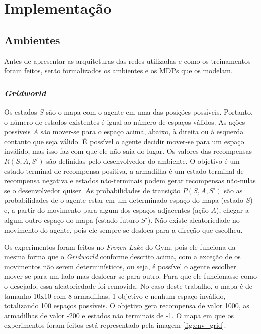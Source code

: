 


\chapter{Implementação}
\label{cap:implementacao}

\section{Ambientes}
\label{sec:envs}


Antes de apresentar as arquiteturas das redes utilizadas e como os treinamentos foram feitos, serão formalizados os ambientes e os \hyperref[sec:mdp]{MDPs} que os modelam.

\subsection{\textit{Gridworld}}
\label{sec:env_gw}

Os estados $S$ são o mapa com o agente em uma das posições possíveis.
Portanto, o número de estados existentes é igual ao número de espaços válidos.
As ações possíveis $A$ são mover-se para o espaço acima, abaixo, à direita ou à esquerda contanto que seja válido.
É possível o agente decidir mover-se para um espaço inválido, mas isso faz com que ele não saia do lugar.
Os valores das recompensas $R(S,A,S')$ são definidas pelo desenvolvedor do ambiente.
O objetivo é um estado terminal de recompensa positiva, a armadilha é um estado terminal de recompensa negativa e estados não-terminais podem gerar recompensas não-nulas se o desenvolvedor quiser.
As probabilidades de transição $P(S,A,S')$ são as probabilidades de o agente estar em um determinado espaço do mapa (estado $S$) e, a partir do movimento para algum dos espaços adjacentes (ação $A$), chegar a algum outro espaço do mapa (estado futuro $S'$).
Não existe aleatoriedade no movimento do agente, pois ele sempre se desloca para a direção que escolheu.

Os experimentos foram feitos no \textit{Frozen Lake} do Gym, pois ele funciona da mesma forma que o \textit{Gridworld} conforme descrito acima, com a exceção de os movimentos não serem determinísticos, ou seja, é possível o agente escolher mover-se para um lado mas deslocar-se para outro.
Para que ele funcionasse como o desejado, essa aleatoriedade foi removida.
No caso deste trabalho, o mapa é de tamanho 10x10 com 8 armadilhas, 1 objetivo e nenhum espaço inválido, totalizando 100 espaços possíveis.
O objetivo gera recompensa de valor 1000, as armadilhas de valor -200 e estados não terminais de -1.
O mapa em que os experimentos foram feitos está representado pela imagem \ref{fig:env_grid}.

